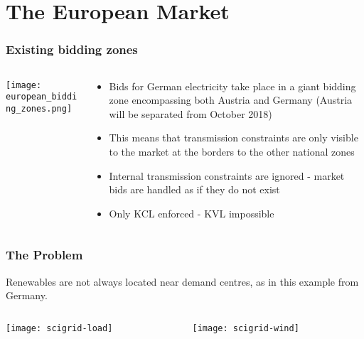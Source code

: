 \documentclass[10pt,aspectratio=169,dvipsnames]{beamer}
\let\olditem\item
\renewcommand{\item}{%
\olditem\vspace{5pt}}
\begin{document}
\section{The European Market}


\begin{frame}
  \frametitle{Existing bidding zones}



\begin{columns}[T]
  \begin{column}{5cm}

    \vspace{.5cm}
    \texttt{[image: european\_bidding\_zones.png]}
  \end{column}

  \begin{column}{6cm}

    \begin{itemize}
    \item Bids for German electricity take place in a \alert{giant bidding zone} encompassing both Austria and Germany (Austria will be separated from October 2018)
    \item This means that transmission constraints are only visible to the market at the \alert{borders} to the other national zones
    \item Internal transmission constraints are \alert{ignored} - market bids are handled as if they do not exist
    \item Only KCL enforced - KVL impossible
    \end{itemize}

\end{column}
\end{columns}


\end{frame}


\begin{frame}
  \frametitle{The Problem}

  Renewables are not always located near demand centres, as in this example from Germany.



\begin{columns}[T]
  \begin{column}{6cm}
\texttt{[image: scigrid-load]}
  \end{column}

  \begin{column}{6cm}
  \texttt{[image: scigrid-wind]}


\end{column}
\end{columns}

\end{frame}
\end{document}
